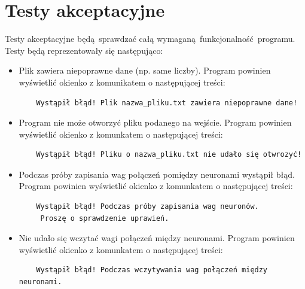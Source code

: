 \documentclass[8pt]{article}
\begin{document}
\section{Testy akceptacyjne}
\hspace*{1 cm}Testy akceptacyjne będą sprawdzać całą wymaganą funkcjonalność programu. Testy będą reprezentowały się następująco: 
\begin{itemize}
	\item Plik zawiera niepoprawne dane (np. same liczby).\newline
	Program powinien wyświetlić okienko z komunikatem o następującej treści:
	\begin{verbatim}
	Wystąpił błąd! Plik nazwa_pliku.txt zawiera niepoprawne dane!
	\end{verbatim}
	\item Program nie może otworzyć pliku podanego na wejście. \newline 
	Program powinien wyświetlić okienko z komunkatem o następującej treści:
	\begin{verbatim}
	Wystąpił błąd! Pliku o nazwa_pliku.txt nie udało się otwrozyć!
	\end{verbatim}
	\item Podczas próby zapisania wag połączeń pomiędzy neuronami wystąpił błąd. \newline
	Program powinien wyświetlić okienko z komunkatem o następującej treści:
	\begin{verbatim}
	Wystąpił błąd! Podczas próby zapisania wag neuronów.
	 Proszę o sprawdzenie uprawień.
	\end{verbatim}
	\item Nie udało się wczytać wagi połączeń między neuronami.\newline
	Program powinien wyświetlić okienko z komunkatem o następującej treści:
	\begin{verbatim}
	Wystąpił błąd! Podczas wczytywania wag połączeń między neuronami.
	\end{verbatim}
\end{itemize}
\end{document}
